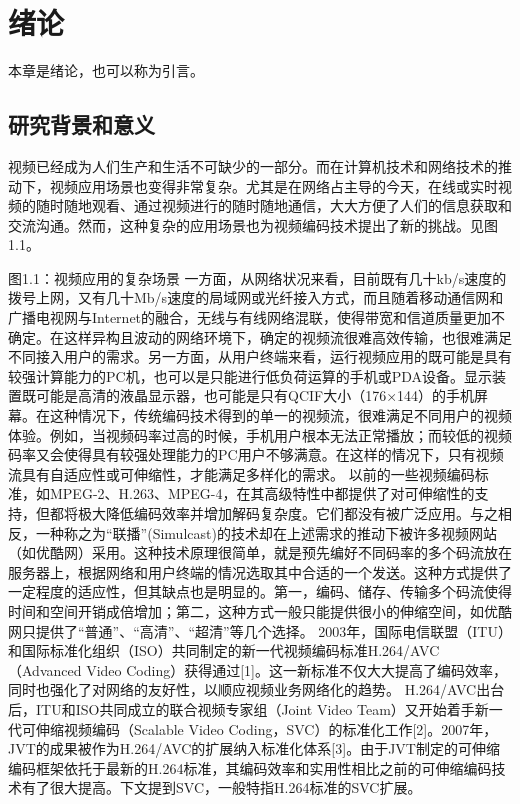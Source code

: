 \chapter{绪论}
本章是绪论，也可以称为引言。

\section{研究背景和意义}
视频已经成为人们生产和生活不可缺少的一部分。而在计算机技术和网络技术的推动下，视频应用场景也变得非常复杂。尤其是在网络占主导的今天，在线或实时视频的随时随地观看、通过视频进行的随时随地通信，大大方便了人们的信息获取和交流沟通。然而，这种复杂的应用场景也为视频编码技术提出了新的挑战。见图1.1。

图1.1：视频应用的复杂场景
一方面，从网络状况来看，目前既有几十kb/s速度的拨号上网，又有几十Mb/s速度的局域网或光纤接入方式，而且随着移动通信网和广播电视网与Internet的融合，无线与有线网络混联，使得带宽和信道质量更加不确定。在这样异构且波动的网络环境下，确定的视频流很难高效传输，也很难满足不同接入用户的需求。另一方面，从用户终端来看，运行视频应用的既可能是具有较强计算能力的PC机，也可以是只能进行低负荷运算的手机或PDA设备。显示装置既可能是高清的液晶显示器，也可能是只有QCIF大小（176×144）的手机屏幕。在这种情况下，传统编码技术得到的单一的视频流，很难满足不同用户的视频体验。例如，当视频码率过高的时候，手机用户根本无法正常播放；而较低的视频码率又会使得具有较强处理能力的PC用户不够满意。在这样的情况下，只有视频流具有自适应性或可伸缩性，才能满足多样化的需求。
以前的一些视频编码标准，如MPEG-2、H.263、MPEG-4，在其高级特性中都提供了对可伸缩性的支持，但都将极大降低编码效率并增加解码复杂度。它们都没有被广泛应用。与之相反，一种称之为“联播”(Simulcast)的技术却在上述需求的推动下被许多视频网站（如优酷网）采用。这种技术原理很简单，就是预先编好不同码率的多个码流放在服务器上，根据网络和用户终端的情况选取其中合适的一个发送。这种方式提供了一定程度的适应性，但其缺点也是明显的。第一，编码、储存、传输多个码流使得时间和空间开销成倍增加；第二，这种方式一般只能提供很小的伸缩空间，如优酷网只提供了“普通”、“高清”、“超清”等几个选择。
2003年，国际电信联盟（ITU）和国际标准化组织（ISO）共同制定的新一代视频编码标准H.264/AVC（Advanced Video Coding）获得通过[1]。这一新标准不仅大大提高了编码效率，同时也强化了对网络的友好性，以顺应视频业务网络化的趋势。 H.264/AVC出台后，ITU和ISO共同成立的联合视频专家组（Joint Video Team）又开始着手新一代可伸缩视频编码（Scalable Video Coding，SVC）的标准化工作[2]。2007年，JVT的成果被作为H.264/AVC的扩展纳入标准化体系[3]。由于JVT制定的可伸缩编码框架依托于最新的H.264标准，其编码效率和实用性相比之前的可伸缩编码技术有了很大提高。下文提到SVC，一般特指H.264标准的SVC扩展。
